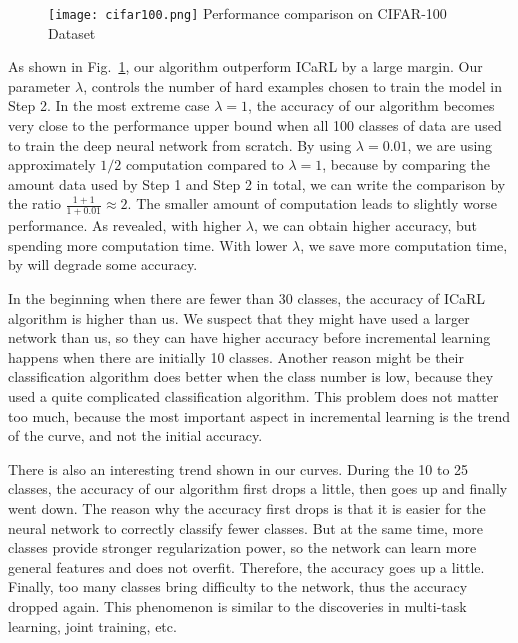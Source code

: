 \begin{figure}[!htp]
	\centering
	\texttt{[image: cifar100.png]}
	{Performance comparison on CIFAR-100 Dataset}
	\label{fig:cifar100}
\end{figure}


As shown in Fig.~\ref{fig:cifar100}, our algorithm outperform ICaRL by a large margin. Our parameter $\lambda$, controls the number of hard examples chosen to train the model in Step 2. In the most extreme case $\lambda = 1$, the accuracy of our algorithm becomes very close to the performance upper bound when all 100 classes of data are used to train the deep neural network from scratch. By using $\lambda=0.01$, we are using approximately $1/2$ computation compared to $\lambda=1$, because by comparing the amount data used by Step 1 and Step 2 in total, we can write the comparison by the ratio $\frac{1+1}{1+0.01} \approx 2$. The smaller amount of computation leads to slightly worse performance. As revealed, with higher $\lambda$, we can obtain higher accuracy, but spending more computation time. With lower $\lambda$, we save more computation time, by will degrade some accuracy.

In the beginning when there are fewer than 30 classes, the accuracy of ICaRL algorithm is higher than us. We suspect that they might have used a larger network than us, so they can have higher accuracy before incremental learning happens when there are initially 10 classes. Another reason might be their classification algorithm does better when the class number is low, because they used a quite complicated classification algorithm. This problem does not matter too much, because the most important aspect in incremental learning is the trend of the curve, and not the initial accuracy.

There is also an interesting trend shown in our curves. During the 10 to 25 classes, the accuracy of our algorithm first drops a little, then goes up and finally went down. The reason why the accuracy first drops is that it is easier for the neural network to correctly classify fewer classes. But at the same time, more classes provide stronger regularization power, so the network can learn more general features and does not overfit. Therefore, the accuracy goes up a little. Finally, too many classes bring difficulty to the network, thus the accuracy dropped again. This phenomenon is similar to the discoveries in multi-task learning, joint training, etc. 

